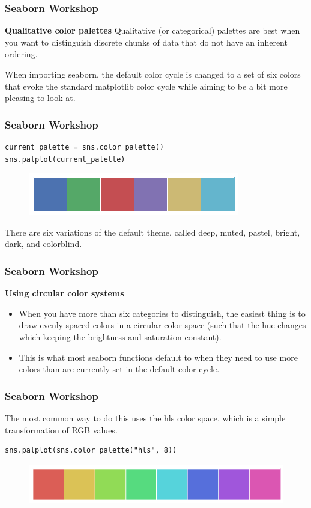 \documentclass{beamer}
\begin{document}
\begin{frame}[fragile]
\frametitle{Seaborn Workshop}
\large
\noindent \textbf{Qualitative color palettes}
Qualitative (or categorical) palettes are best when you want to distinguish discrete chunks of data that do not have an inherent ordering.

When importing seaborn, the default color cycle is changed to a set of six colors that evoke the standard matplotlib color cycle while aiming to be a bit more pleasing to look at.
\end{frame}
\begin{frame}[fragile]
	\frametitle{Seaborn Workshop}
	\large
\begin{verbatim}
current_palette = sns.color_palette()
sns.palplot(current_palette)
\end{verbatim}
\begin{figure}
\centering
\includegraphics[width=0.7\linewidth]{images/color_palettes_8_0}
\end{figure}

There are six variations of the default theme, called deep, muted, pastel, bright, dark, and colorblind.
\end{frame}
\begin{frame}[fragile]
\frametitle{Seaborn Workshop}
\large
\noindent \textbf{Using circular color systems}
\begin{itemize}
\item When you have more than six categories to distinguish, the easiest thing is to draw evenly-spaced colors in a circular color space (such that the hue changes which keeping the brightness and saturation constant). 
\item This is what most seaborn functions default to when they need to use more colors than are currently set in the default color cycle.
\end{itemize}

\end{frame}
\begin{frame}[fragile]
	\frametitle{Seaborn Workshop}
	\large
The most common way to do this uses the hls color space, which is a simple transformation of RGB values.

\begin{verbatim}
sns.palplot(sns.color_palette("hls", 8))
\end{verbatim}
\begin{figure}
\centering
\includegraphics[width=0.7\linewidth]{images/color_palettes_10_0}
\caption{}
\label{fig:color_palettes_10_0}
\end{figure}


\end{frame}
\end{document}
